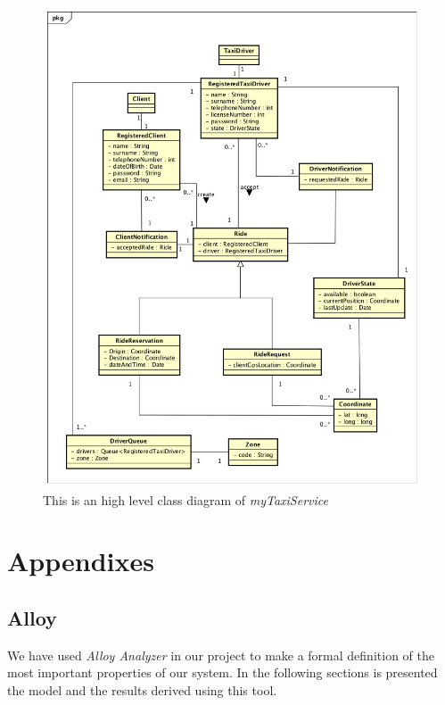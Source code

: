 \documentclass[a4paper]{article}
\let\stdsection\section
\renewcommand\section{\newpage\stdsection}
\begin{document}
\begin{figure}[H]
\includegraphics[width=\sequenceWidth]{ClassDiagramMyTaxiService}
\centering
\caption[UML Class Diagram]{This is an high level class diagram of \emph{myTaxiService}}
\label{fig:classdiagram}
\end{figure}

\section{Appendixes}

\subsection{Alloy}

We have used \emph{Alloy Analyzer} in our project to make a formal definition of the most important properties of our system. In the following sections is presented the model and the results derived using this tool.

\newlength{\codeWidth}
\setlength{\codeWidth}{\textwidth}
\end{document}
